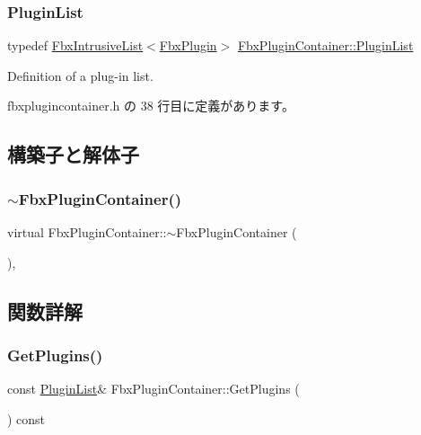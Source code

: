 \subsubsection{\texorpdfstring{Plugin\+List}{PluginList}}
{\footnotesize\ttfamily typedef \hyperlink{class_fbx_intrusive_list}{Fbx\+Intrusive\+List}$<$\hyperlink{class_fbx_plugin}{Fbx\+Plugin}$>$ \hyperlink{class_fbx_plugin_container_a42abd8471efa91f56de2c4c64c220972}{Fbx\+Plugin\+Container\+::\+Plugin\+List}}



Definition of a plug-\/in list. 



 fbxplugincontainer.\+h の 38 行目に定義があります。



\subsection{構築子と解体子}
\mbox{\label{class_fbx_plugin_container_a8c4030ad7c08c7fdab1b34b7d37ed88e}} 
\subsubsection{\texorpdfstring{$\sim$\+Fbx\+Plugin\+Container()}{~FbxPluginContainer()}}
{\footnotesize\ttfamily virtual Fbx\+Plugin\+Container\+::$\sim$\+Fbx\+Plugin\+Container (\begin{DoxyParamCaption}{ }\end{DoxyParamCaption})\hspace{0.3cm}{\ttfamily [protected]}, {\ttfamily [virtual]}}



\subsection{関数詳解}
\mbox{\label{class_fbx_plugin_container_a5fb043debeddd64f7e0f6c34b882b3a9}} 
\subsubsection{\texorpdfstring{Get\+Plugins()}{GetPlugins()}\hspace{0.1cm}{\footnotesize\ttfamily [1/2]}}
{\footnotesize\ttfamily const \hyperlink{class_fbx_plugin_container_a42abd8471efa91f56de2c4c64c220972}{Plugin\+List}\& Fbx\+Plugin\+Container\+::\+Get\+Plugins (\begin{DoxyParamCaption}{ }\end{DoxyParamCaption}) const}

